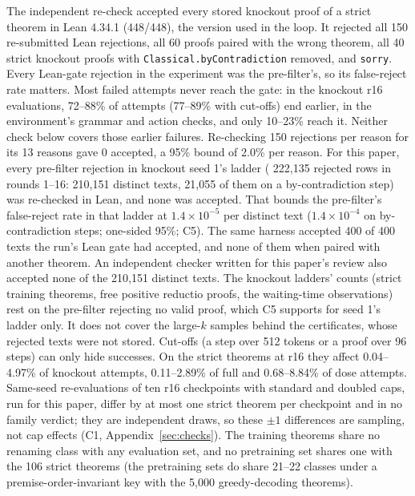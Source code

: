 The independent re-check accepted every stored knockout proof of a strict theorem in Lean 4.34.1 (448/448), the version
used in the loop. It rejected all 150 re-submitted Lean rejections, all 60 proofs paired with the wrong theorem, all 40
strict knockout proofs with \texttt{Classical.byContradiction} removed, and \texttt{sorry}. \rv{} Every Lean-gate
rejection in the experiment was the pre-filter's, so its false-reject rate matters. Most failed attempts never reach the
gate: in the knockout r16 evaluations, 72--88\% of attempts (77--89\% with cut-offs) end earlier, in the environment's
grammar and action checks, and only 10--23\% reach it. Neither check below covers those earlier failures. Re-checking 150 rejections per reason for its 13
reasons gave 0 accepted, a 95\% bound of 2.0\% per reason. For this paper, every pre-filter rejection in knockout
seed 1's ladder (\rv{} 222,135 rejected rows in rounds 1--16: 210,151 distinct texts, 21,055 of them on a by-contradiction
step) was re-checked in Lean, and none was accepted. That bounds the pre-filter's false-reject rate in that ladder
at \rv{} $1.4\times10^{-5}$ per distinct text ($1.4\times10^{-4}$ on by-contradiction steps; one-sided 95\%; C5). The
same harness accepted 400 of 400 texts the run's Lean gate had accepted, and none of them when paired with another
theorem. \rv{} An independent checker written for this paper's review also accepted none of the 210,151 distinct texts.
The knockout ladders' counts (strict training theorems,
free positive reductio proofs, the waiting-time observations) rest on the pre-filter rejecting no valid proof, which C5
supports for seed 1's ladder only. It does not cover the large-$k$ samples behind the certificates, whose rejected texts
were not stored. Cut-offs (a step over 512 tokens or a proof over 96 steps) can only hide successes. On the strict theorems at r16
they affect 0.04--4.97\% of knockout attempts, 0.11--2.89\% of full and 0.68--8.84\% of dose attempts. \rv{} Same-seed
re-evaluations of ten r16 checkpoints with standard and doubled caps, run for this paper, differ by at most one strict
theorem per checkpoint and in no family verdict; they are independent draws, so these $\pm1$ differences are sampling,
not cap effects (C1, Appendix~\ref{sec:checks}). The training theorems share no renaming class with any evaluation set, and no
pretraining set shares one with the 106 strict theorems (the pretraining sets do share 21--22 classes under a
premise-order-invariant key with the 5,000 greedy-decoding theorems).
